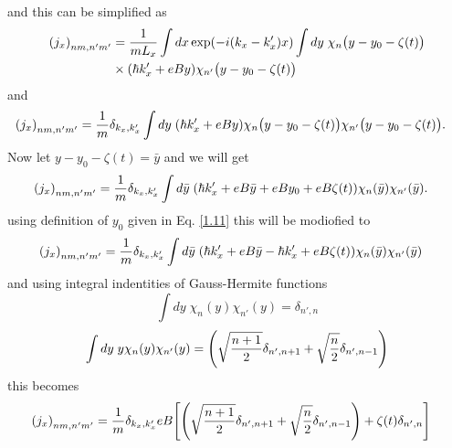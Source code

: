 and this can be simplified as
\begin{equation} \label{6.7}
  \begin{aligned}
    \qty({j}_x)_{nm,n'm'} & =
    \frac{1}{{mL_x}}
    \int dx \exp(-i(k_x-k'_x) x)
    \int dy \;
     \chi_{n}\big(y - y_0 - \zeta(t)\big) \\
    & \times
    \qty(\hbar k'_x + eBy)
    \chi_{n'}\big(y - y_0 - \zeta(t)\big)
  \end{aligned}
\end{equation}
and
\begin{equation} \label{6.8}
  \begin{aligned}
    \qty({j}_x)_{nm,n'm'} & =
    \frac{1}{{m}}
    \delta_{k_x,k'_x}
    \int dy \;
    \qty(\hbar k'_x + eBy)
     \chi_{n}\big(y - y_0 - \zeta(t)\big)
    \chi_{n'}\big(y - y_0 - \zeta(t)\big).
  \end{aligned}
\end{equation}
Now let $y - y_0 - \zeta(t) = \bar{y}$ and we will get
\begin{equation} \label{6.9}
  \begin{aligned}
    \qty({j}_x)_{nm,n'm'} & =
    \frac{1}{{m}}
    \delta_{k_x,k'_x}
    \int d\bar{y} \;
    \qty(\hbar k'_x + eB\bar{y} + eBy_0 + eB\zeta(t))
     \chi_{n}(\bar{y})
    \chi_{n'}(\bar{y}).
  \end{aligned}
\end{equation}
using definition of $y_0$ given in Eq. \eqref{1.11} this will be modiofied to
\begin{equation} \label{6.10}
  \begin{aligned}
    \qty({j}_x)_{nm,n'm'} & =
    \frac{1}{{m}}
    \delta_{k_x,k'_x}
    \int d\bar{y} \;
    \qty(\hbar k'_x + eB\bar{y} -\hbar k'_x + eB\zeta(t))
     \chi_{n}(\bar{y})
    \chi_{n'}(\bar{y})
  \end{aligned}
\end{equation}
and using integral indentities of Gauss-Hermite functions
\begin{equation} \label{6.11}
    \int d{y} \;
    \chi_{n}({y})
    \chi_{n'}({y}) =
    \delta_{n',n}
\end{equation}
\begin{equation} \label{6.12}
    \int dy \;
    y
    \chi_{n}({y})
    \chi_{n'}({y}) =
    \qty(\sqrt{\frac{n+1}{2}} \delta_{n',n+1} + \sqrt{\frac{n}{2}}
    \delta_{n',n-1})
\end{equation}
this becomes
\begin{equation} \label{6.13}
  \begin{aligned}
    \qty({j}_x)_{nm,n'm'} & =
    \frac{1}{{m}}
    \delta_{k_x,k'_x}
    eB
    \qty[
    \qty(\sqrt{\frac{n+1}{2}} \delta_{n',n+1} + \sqrt{\frac{n}{2}}
    \delta_{n',n-1})
    + \zeta(t) \delta_{n',n}
    ]
  \end{aligned}
\end{equation}
